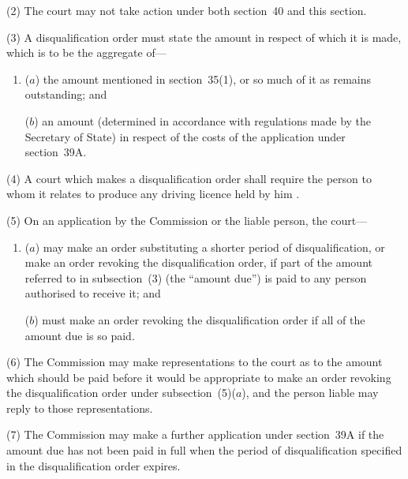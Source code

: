 \documentclass[12pt,a4paper]{article}
\begin{document}
(2) The court may not take action under both section~40 and this section.

(3) A disqualification order must state the amount in respect of which it is made, which is to be the aggregate of—
\begin{enumerate}\item[]
($a$) the amount mentioned in section~35(1), or so much of it as remains outstanding; and


($b$) an amount (determined in accordance with regulations made by the Secretary of State) in respect of the costs of the application under section~39A.
\end{enumerate}

(4) A court which makes a disqualification order shall require the person to whom it relates to produce any driving licence held by him%
.

(5) On an application by the 
Commission  %
or the liable person, the court—
\begin{enumerate}\item[]
($a$) may make an order substituting a shorter period of disqualification, or make an order revoking the disqualification order, if part of the amount referred to in subsection~(3)  (the “amount due”) is paid to any person authorised to receive it; and

($b$) must make an order revoking the disqualification order if all of the amount due is so paid.
\end{enumerate}

(6) The 
Commission  %
may make representations to the court as to the amount which should be paid before it would be appropriate to make an order revoking the disqualification order under subsection~(5)($a$), and the person liable may reply to those representations.

(7) The 
Commission  %
may make a further application under section~39A if the amount due has not been paid in full when the period of disqualification specified in the disqualification order expires.
\end{document}
